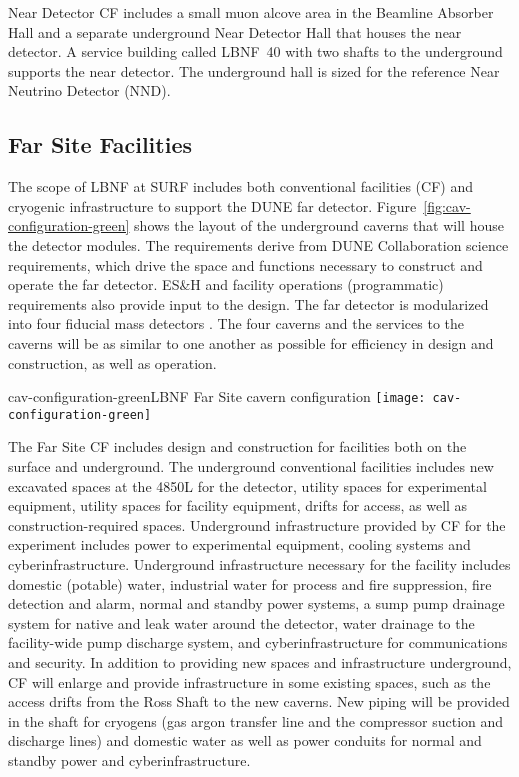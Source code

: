 Near Detector CF includes a small muon alcove area in the Beamline Absorber Hall and a separate underground Near Detector Hall that houses the near detector. A service building called LBNF~40 with two shafts to the underground supports the near detector. The underground hall is sized for the reference Near Neutrino Detector (NND). 

\subsection{Far Site Facilities}

The scope of LBNF at SURF includes both conventional facilities (CF) and cryogenic infrastructure to support the DUNE far detector. Figure~\ref{fig:cav-configuration-green} shows the layout of the underground caverns that will house the detector modules. The requirements derive from DUNE Collaboration science requirements, which drive the space and functions necessary to construct and operate the far detector.  ES\&H and facility operations (programmatic) requirements also provide input to the design. The far detector is modularized into four  fiducial mass detectors . The four caverns and the services to the caverns will be as similar to one another as possible for %
efficiency in design and construction, as well as operation. 

\begin{cdrfigure}{cav-configuration-green}{LBNF Far Site cavern configuration}  
\texttt{[image: cav-configuration-green]}
\end{cdrfigure}


The %
Far Site CF includes design and construction for facilities both on the surface and underground. The underground conventional facilities includes new excavated spaces at the 4850L for the detector, utility spaces for experimental equipment, utility spaces for facility equipment, drifts for access, as well as construction-required spaces. Underground infrastructure provided by CF for the experiment includes power to experimental equipment, cooling systems and cyberinfrastructure. Underground infrastructure necessary for the facility includes domestic (potable) water, industrial water for process and fire suppression, fire detection and alarm, normal and standby power systems, a sump pump drainage system for native and leak water around the detector, water drainage to the facility-wide pump discharge system, and cyberinfrastructure for communications and security.
In addition to providing new spaces and infrastructure underground, CF will enlarge and provide infrastructure in some existing spaces, %
such as the access drifts from the Ross Shaft to the new caverns. New piping will be provided in the shaft for cryogens (gas argon transfer line and the compressor suction and discharge lines) and domestic water as well as power conduits for normal and standby power and cyberinfrastructure. 

